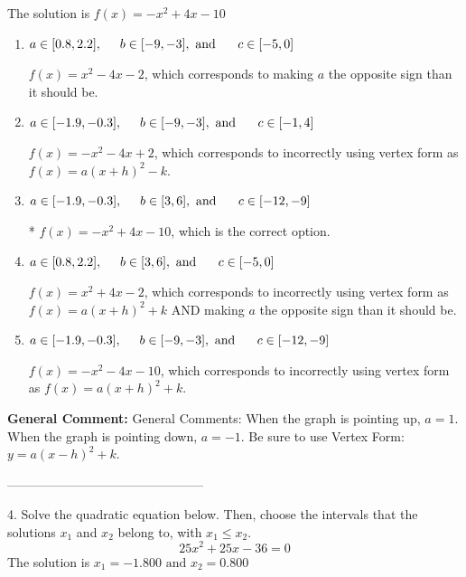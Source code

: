 \documentclass{extbook}[14pt]
\begin{document}
The solution is $ f(x) = -x^{2} +4 x -10 $ 

\begin{enumerate}[label=\Alph*.] 
\item $ a \in [0.8, 2.2], \hspace*{5mm} b \in [-9, -3], \text{ and } \hspace*{5mm} c \in [-5, 0] $ 

 $f(x)=x^{2} -4 x -2$, which corresponds to making $a$ the opposite sign than it should be. 
\item $ a \in [-1.9, -0.3], \hspace*{5mm} b \in [-9, -3], \text{ and } \hspace*{5mm} c \in [-1, 4] $ 

 $f(x)=-x^{2} -4 x + 2$, which corresponds to incorrectly using vertex form as $f(x) = a(x+h)^2 - k$. 
\item $ a \in [-1.9, -0.3], \hspace*{5mm} b \in [3, 6], \text{ and } \hspace*{5mm} c \in [-12, -9] $ 

 * $f(x)=-x^{2} +4 x -10$, which is the correct option. 
\item $ a \in [0.8, 2.2], \hspace*{5mm} b \in [3, 6], \text{ and } \hspace*{5mm} c \in [-5, 0] $ 

 $f(x)=x^{2} +4 x -2$, which corresponds to incorrectly using vertex form as $f(x) = a(x+h)^2+k$ AND making $a$ the opposite sign than it should be. 
\item $ a \in [-1.9, -0.3], \hspace*{5mm} b \in [-9, -3], \text{ and } \hspace*{5mm} c \in [-12, -9] $ 

 $f(x)=-x^{2} -4 x -10$, which corresponds to incorrectly using vertex form as $f(x) = a(x+h)^2+k$. 
\end{enumerate} 
 
\textbf{General Comment:} General Comments: When the graph is pointing up, $a=1$. When the graph is pointing down, $a=-1$. Be sure to use Vertex Form: $y = a(x-h)^2+k$. 

-----------------------------------------------

4. Solve the quadratic equation below. Then, choose the intervals that the solutions $x_1$ and $x_2$ belong to, with $x_1 \leq x_2$.
\[ 25x^{2} +25 x -36 = 0 \] 
The solution is $ x_1 = -1.800 \text{ and } x_2 = 0.800 $ 
\end{document}
